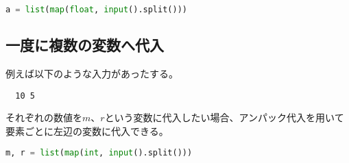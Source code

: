 \begin{lstlisting}[language=Python]
  a = list(map(float, input().split()))
\end{lstlisting}

\subsection{一度に複数の変数へ代入}

例えば以下のような入力があったする。

\begin{lstlisting}
  10 5
\end{lstlisting}

それぞれの数値を$m$、$r$という変数に代入したい場合、アンパック代入を用いて
要素ごとに左辺の変数に代入できる。

\begin{lstlisting}[language=Python]
  m, r = list(map(int, input().split()))
\end{lstlisting}
